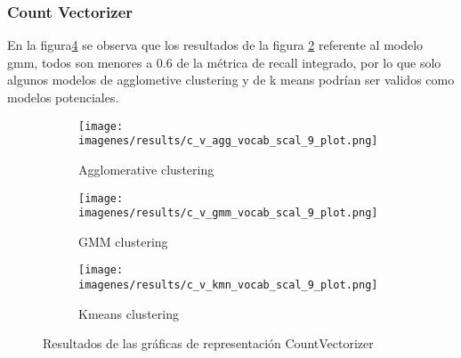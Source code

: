 \documentclass[12pt]{article}
\begin{document}
		\subsubsection{Count Vectorizer}		
		En la figura\ref{fig:count_vectorizer_results} se observa que los resultados de la figura \ref{fig:cv_gmm_vocab_scal_9} referente al modelo gmm, todos son menores a 0.6 de la métrica de recall integrado, por lo que solo algunos modelos de agglometive clustering y de k means podrían ser validos como modelos potenciales.
			\begin{figure}[h]
			\centering\begin{subfigure}[b]{0.5\linewidth} 
				\centering\texttt{[image: imagenes/results/c\_v\_agg\_vocab\_scal\_9\_plot.png]} 
				\caption{\label{fig:cv_agg_vocab_scal_9}Agglomerative clustering} 
			\end{subfigure}\hfill
			\begin{subfigure}[b]{0.5\linewidth} 
				\centering\texttt{[image: imagenes/results/c\_v\_gmm\_vocab\_scal\_9\_plot.png]} 
				\caption{\label{fig:cv_gmm_vocab_scal_9}GMM clustering} 
			\end{subfigure}\vspace{10pt}
			
			\begin{subfigure}[b]{\linewidth} 
				\centering\texttt{[image: imagenes/results/c\_v\_kmn\_vocab\_scal\_9\_plot.png]} 
				\caption{\label{fig:cv_kmn_vocab_scal_9}Kmeans clustering} 
			\end{subfigure} 
			\caption{Resultados de las gráficas de representación CountVectorizer} 
			\label{fig:count_vectorizer_results}
			\end{figure} 		
					
\end{document}
